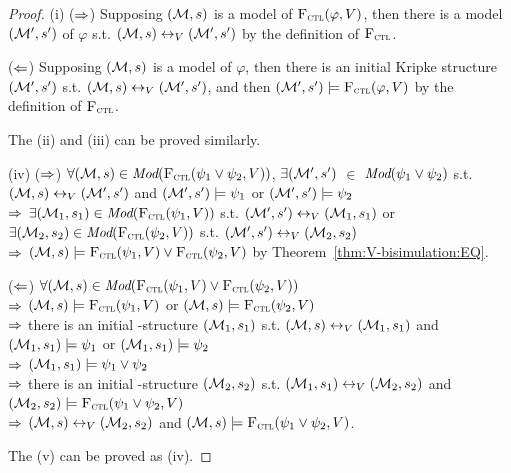 \documentclass{article}
\begin{document}
\begin{proof}
(i) ($\Rightarrow$) Supposing $({\cal M}, s)$ is a model of ${\textsc{F}_{\textsc{ctl}}}(\varphi, V)$, then there is a model $({\cal M}',s')$ of $\varphi$ s.t. $({\cal M},s) \leftrightarrow_V ({\cal M}',s')$ by the definition of ${\textsc{F}_{\textsc{ctl}}}$.

($\Leftarrow$) Supposing $({\cal M}, s)$ is a model of $\varphi$, then there is an initial Kripke structure $({\cal M}',s')$ s.t. $({\cal M},s) \leftrightarrow_V ({\cal M}',s')$, and then $({\cal M}',s') \models {\textsc{F}_{\textsc{ctl}}}(\varphi, V)$ by the definition of ${\textsc{F}_{\textsc{ctl}}}$.

The (ii) and (iii) can be proved similarly.

(iv) ($\Rightarrow$) $\forall ({\cal M},s)\in \textit{Mod}({\textsc{F}_{\textsc{ctl}}}(\psi_1 \vee \psi_2, V))$, $\exists ({\cal M}',s')$ $\in$  $\textit{Mod}(\psi_1\vee \psi_2)$ s.t. $({\cal M},s) \leftrightarrow_V ({\cal M}',s')$ and $({\cal M}',s') \models \psi_1$ or $({\cal M}',s') \models \psi_2$ \\
$\Rightarrow$ $\exists ({\cal M}_1,s_1) \in \textit{Mod}({\textsc{F}_{\textsc{ctl}}}(\psi_1, V))$ s.t. $({\cal M}',s') \leftrightarrow_V ({\cal M}_1,s_1)$ or $\exists ({\cal M}_2,s_2) \in \textit{Mod}({\textsc{F}_{\textsc{ctl}}}(\psi_2, V))$ s.t. $({\cal M}',s') \leftrightarrow_V ({\cal M}_2,s_2)$ \\
$\Rightarrow$ $({\cal M},s) \models {\textsc{F}_{\textsc{ctl}}}(\psi_1, V) \vee {\textsc{F}_{\textsc{ctl}}}(\psi_2, V)$ by Theorem~\ref{thm:V-bisimulation:EQ}.

($\Leftarrow$) $\forall ({\cal M},s) \in \textit{Mod}({\textsc{F}_{\textsc{ctl}}}(\psi_1, V) \vee {\textsc{F}_{\textsc{ctl}}}(\psi_2, V))$\\
$\Rightarrow$ $({\cal M},s) \models {\textsc{F}_{\textsc{ctl}}}(\psi_1,V)$ or $({\cal M},s) \models {\textsc{F}_{\textsc{ctl}}}(\psi_2,V)$\\
$\Rightarrow$ there is an initial \MPK-structure $({\cal M}_1,s_1)$ s.t. $({\cal M},s) \leftrightarrow_V ({\cal M}_1,s_1)$ and $({\cal M}_1,s_1) \models \psi_1$ or  $({\cal M}_1,s_1) \models \psi_2$\\
$\Rightarrow$ $({\cal M}_1,s_1) \models \psi_1 \vee \psi_2$\\
$\Rightarrow$ there is an initial \MPK-structure $({\cal M}_2,s_2)$ s.t. $({\cal M}_1,s_1) \leftrightarrow_V ({\cal M}_2,s_2)$ and $({\cal M}_2,s_2) \models {\textsc{F}_{\textsc{ctl}}}(\psi_1 \vee \psi_2, V)$\\
$\Rightarrow$ $({\cal M},s) \leftrightarrow_V ({\cal M}_2,s_2)$ and $({\cal M},s) \models {\textsc{F}_{\textsc{ctl}}}(\psi_1 \vee \psi_2, V)$.

The (v) can be proved as (iv).
\end{proof}
\end{document}
